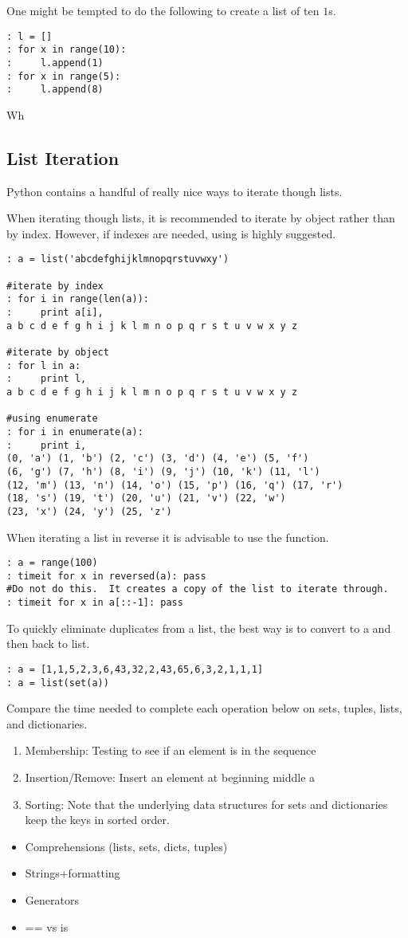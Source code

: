 One might be tempted to do the following to create a list of ten $1$s.
\begin{lstlisting}
: l = []
: for x in range(10):
:     l.append(1)
: for x in range(5):
:     l.append(8)
\end{lstlisting}
Wh


\subsection*{List Iteration}
Python contains a handful of really nice ways to iterate though lists.

When iterating though lists, it is recommended to iterate by object rather than by index.
However, if indexes are needed, using  is highly suggested.
\begin{lstlisting}
: a = list('abcdefghijklmnopqrstuvwxy')

#iterate by index
: for i in range(len(a)):
:     print a[i],
a b c d e f g h i j k l m n o p q r s t u v w x y z

#iterate by object
: for l in a:
:     print l,
a b c d e f g h i j k l m n o p q r s t u v w x y z

#using enumerate
: for i in enumerate(a):
:     print i,
(0, 'a') (1, 'b') (2, 'c') (3, 'd') (4, 'e') (5, 'f') 
(6, 'g') (7, 'h') (8, 'i') (9, 'j') (10, 'k') (11, 'l') 
(12, 'm') (13, 'n') (14, 'o') (15, 'p') (16, 'q') (17, 'r') 
(18, 's') (19, 't') (20, 'u') (21, 'v') (22, 'w') 
(23, 'x') (24, 'y') (25, 'z')
\end{lstlisting}

When iterating a list in reverse it is advisable to use the  function.
\begin{lstlisting}
: a = range(100)
: timeit for x in reversed(a): pass
#Do not do this.  It creates a copy of the list to iterate through.
: timeit for x in a[::-1]: pass
\end{lstlisting}

To quickly eliminate duplicates from a list, the best way is to convert to a 
and then back to list.
\begin{lstlisting}
: a = [1,1,5,2,3,6,43,32,2,43,65,6,3,2,1,1,1]
: a = list(set(a))
\end{lstlisting}

\begin{problem}
Compare the time needed to complete each operation below on sets, tuples, lists, and dictionaries.
\begin{enumerate}
\item Membership: Testing to see if an element is in the sequence
\item Insertion/Remove: Insert an element at beginning middle a
\item Sorting: Note that the underlying data structures for sets and dictionaries keep the keys in sorted order.
\end{enumerate}

\end{problem}



\begin{itemize}
\item Comprehensions (lists, sets, dicts, tuples)
\item Strings+formatting
\item Generators
\item == vs is
\end{itemize}